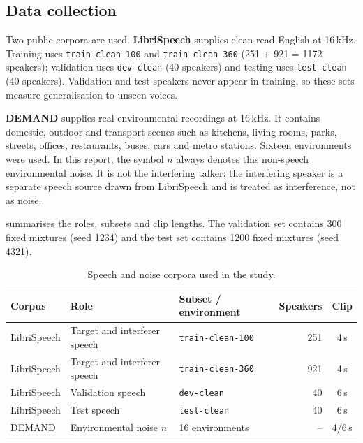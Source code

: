 \documentclass[11pt,a4paper]{article}
\begin{document}
\subsection{Data collection}
\label{sec:data}
Two public corpora are used. \textbf{LibriSpeech} \cite{panayotov2015librispeech} supplies clean
read English at 16\,kHz. Training uses \texttt{train-clean-100} and \texttt{train-clean-360}
(251 + 921 = 1172 speakers); validation uses \texttt{dev-clean} (40 speakers) and testing uses
\texttt{test-clean} (40 speakers). Validation and test speakers never appear in training, so these
sets measure generalisation to unseen voices.

\textbf{DEMAND} \cite{thiemann2013demand} supplies real environmental recordings at 16\,kHz. It
contains domestic, outdoor and transport scenes such as kitchens, living rooms, parks, streets,
offices, restaurants, buses, cars and metro stations. Sixteen environments were used. In this
report, the symbol $n$ always
denotes this non-speech environmental noise. It is not the interfering talker: the interfering
speaker is a separate speech source drawn from LibriSpeech and is treated as interference, not as
noise.

 summarises the roles, subsets and clip lengths. The validation set contains 300
fixed mixtures (seed 1234) and the test set contains 1200 fixed mixtures (seed 4321).

\begin{table}[htbp]
\centering\footnotesize
\caption{Speech and noise corpora used in the study.}
\label{tab:corpora}
\begin{tabularx}{\textwidth}{@{}l l l r c@{}}
\toprule
\textbf{Corpus} & \textbf{Role} & \textbf{Subset / environment} & \textbf{Speakers} & \textbf{Clip}\\
\midrule
LibriSpeech & Target and interferer speech & \texttt{train-clean-100} & 251 & 4\,s\\
LibriSpeech & Target and interferer speech & \texttt{train-clean-360} & 921 & 4\,s\\
LibriSpeech & Validation speech & \texttt{dev-clean} & 40 & 6\,s\\
LibriSpeech & Test speech & \texttt{test-clean} & 40 & 6\,s\\
DEMAND & Environmental noise $n$ & 16 environments & -- & 4/6\,s\\
\bottomrule
\end{tabularx}
\end{table}
\end{document}
